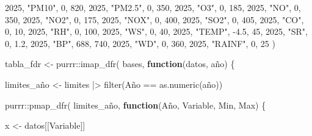 \documentclass[
  letterpaper,
  DIV=11,
  numbers=noendperiod]{scrartcl}
\newenvironment{Shaded}{\begin{snugshade}}{\end{snugshade}}
\newcommand{\ControlFlowTok}[1]{\textcolor[rgb]{0.00,0.23,0.31}{\textbf{#1}}}
\newcommand{\DecValTok}[1]{\textcolor[rgb]{0.68,0.00,0.00}{#1}}
\newcommand{\FloatTok}[1]{\textcolor[rgb]{0.68,0.00,0.00}{#1}}
\newcommand{\FunctionTok}[1]{\textcolor[rgb]{0.28,0.35,0.67}{#1}}
\newcommand{\NormalTok}[1]{\textcolor[rgb]{0.00,0.23,0.31}{#1}}
\newcommand{\OtherTok}[1]{\textcolor[rgb]{0.00,0.23,0.31}{#1}}
\newcommand{\SpecialCharTok}[1]{\textcolor[rgb]{0.37,0.37,0.37}{#1}}
\newcommand{\StringTok}[1]{\textcolor[rgb]{0.13,0.47,0.30}{#1}}
\begin{document}
\begin{Shaded}
\begin{Highlighting}[]
  \DecValTok{2025}\NormalTok{, }\StringTok{"PM10"}\NormalTok{, }\DecValTok{0}\NormalTok{, }\DecValTok{820}\NormalTok{,}
  \DecValTok{2025}\NormalTok{, }\StringTok{"PM2.5"}\NormalTok{, }\DecValTok{0}\NormalTok{, }\DecValTok{350}\NormalTok{,}
  \DecValTok{2025}\NormalTok{, }\StringTok{"O3"}\NormalTok{, }\DecValTok{0}\NormalTok{, }\DecValTok{185}\NormalTok{,}
  \DecValTok{2025}\NormalTok{, }\StringTok{"NO"}\NormalTok{, }\DecValTok{0}\NormalTok{, }\DecValTok{350}\NormalTok{,}
  \DecValTok{2025}\NormalTok{, }\StringTok{"NO2"}\NormalTok{, }\DecValTok{0}\NormalTok{, }\DecValTok{175}\NormalTok{,}
  \DecValTok{2025}\NormalTok{, }\StringTok{"NOX"}\NormalTok{, }\DecValTok{0}\NormalTok{, }\DecValTok{400}\NormalTok{,}
  \DecValTok{2025}\NormalTok{, }\StringTok{"SO2"}\NormalTok{, }\DecValTok{0}\NormalTok{, }\DecValTok{405}\NormalTok{,}
  \DecValTok{2025}\NormalTok{, }\StringTok{"CO"}\NormalTok{, }\DecValTok{0}\NormalTok{, }\DecValTok{10}\NormalTok{,}
  \DecValTok{2025}\NormalTok{, }\StringTok{"RH"}\NormalTok{, }\DecValTok{0}\NormalTok{, }\DecValTok{100}\NormalTok{,}
  \DecValTok{2025}\NormalTok{, }\StringTok{"WS"}\NormalTok{, }\DecValTok{0}\NormalTok{, }\DecValTok{40}\NormalTok{,}
  \DecValTok{2025}\NormalTok{, }\StringTok{"TEMP"}\NormalTok{, }\SpecialCharTok{{-}}\FloatTok{4.5}\NormalTok{, }\DecValTok{45}\NormalTok{,}
  \DecValTok{2025}\NormalTok{, }\StringTok{"SR"}\NormalTok{, }\DecValTok{0}\NormalTok{, }\FloatTok{1.2}\NormalTok{,}
  \DecValTok{2025}\NormalTok{, }\StringTok{"BP"}\NormalTok{, }\DecValTok{688}\NormalTok{, }\DecValTok{740}\NormalTok{,}
  \DecValTok{2025}\NormalTok{, }\StringTok{"WD"}\NormalTok{, }\DecValTok{0}\NormalTok{, }\DecValTok{360}\NormalTok{,}
  \DecValTok{2025}\NormalTok{, }\StringTok{"RAINF"}\NormalTok{, }\DecValTok{0}\NormalTok{, }\DecValTok{25}
\NormalTok{)}

\NormalTok{tabla\_fdr }\OtherTok{\textless{}{-}}\NormalTok{ purrr}\SpecialCharTok{::}\FunctionTok{imap\_dfr}\NormalTok{(}
\NormalTok{  bases,}
  \ControlFlowTok{function}\NormalTok{(datos, año) \{}

\NormalTok{    limites\_año }\OtherTok{\textless{}{-}}\NormalTok{ limites }\SpecialCharTok{|\textgreater{}}
      \FunctionTok{filter}\NormalTok{(Año }\SpecialCharTok{==} \FunctionTok{as.numeric}\NormalTok{(año))}

\NormalTok{    purrr}\SpecialCharTok{::}\FunctionTok{pmap\_dfr}\NormalTok{(}
\NormalTok{      limites\_año,}
      \ControlFlowTok{function}\NormalTok{(Año, Variable, Min, Max) \{}

\NormalTok{        x }\OtherTok{\textless{}{-}}\NormalTok{ datos[[Variable]]}


\end{Highlighting}
\end{Shaded}
\end{document}
